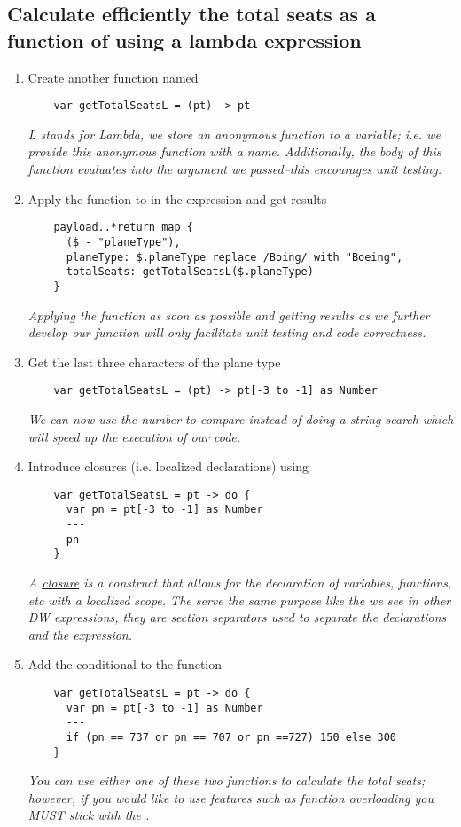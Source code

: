 \subsection{Calculate efficiently the total seats as a function of  using a lambda expression}
\begin{enumerate}[resume*]
\item Create another function named 
  \begin{lstlisting}
    var getTotalSeatsL = (pt) -> pt
  \end{lstlisting}
  \emph{
    L stands for Lambda, we store an anonymous function to a variable; i.e. we provide this anonymous function
    with a name.  Additionally, the body of this function evaluates into the argument we passed--this encourages
    unit testing.
  }
\item Apply the function to in the expression and get results
  \begin{lstlisting}
    payload..*return map {
      ($ - "planeType"),
      planeType: $.planeType replace /Boing/ with "Boeing",
      totalSeats: getTotalSeatsL($.planeType)
    }
  \end{lstlisting}
  \emph{
    Applying the function as soon as possible and getting results as we further develop our function
    will only facilitate unit testing and code correctness.
  }
\item Get the last three characters of the plane type
  \begin{lstlisting}
    var getTotalSeatsL = (pt) -> pt[-3 to -1] as Number
  \end{lstlisting}
  \emph{
    We can now use the number to compare instead of doing a string search which will speed up the execution of
    our code.
  }
\item Introduce closures (i.e. localized declarations) using 
  \begin{lstlisting}
    var getTotalSeatsL = pt -> do {
      var pn = pt[-3 to -1] as Number
      ---
      pn
    }
  \end{lstlisting}
  \emph{
    A \href{https://en.wikipedia.org/wiki/Closure_(computer_programming)}{closure} is a construct that allows for
    the declaration of variables, functions, etc with a localized scope.  The \ttt{---} serve the same purpose
    like the \ttt{---} we see in other DW expressions, they are section separators used to separate the
    declarations and the expression.
  }
\item Add the conditional to the function
  \begin{lstlisting}
    var getTotalSeatsL = pt -> do {
      var pn = pt[-3 to -1] as Number
      ---
      if (pn == 737 or pn == 707 or pn ==727) 150 else 300
    }    
  \end{lstlisting}
  \emph{
    You can use either one of these two functions to calculate the total seats; however, if you would like to use
    features such as function overloading you MUST stick with the .
  }
\end{enumerate}

